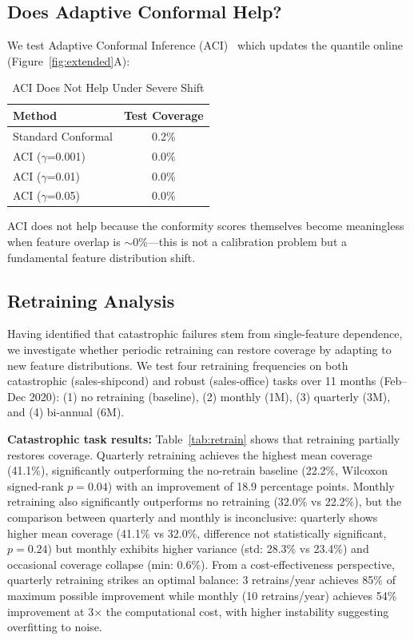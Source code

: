 \documentclass[sigconf]{acmart}
\begin{document}
\subsection{Does Adaptive Conformal Help?}

We test Adaptive Conformal Inference (ACI)~\cite{gibbs2021adaptive} which updates the quantile online (Figure~\ref{fig:extended}A):

\begin{table}[h]
\centering
\caption{ACI Does Not Help Under Severe Shift}
\label{tab:aci}
\begin{tabular}{lc}
\toprule
Method & Test Coverage \\
\midrule
Standard Conformal & 0.2\% \\
ACI ($\gamma$=0.001) & 0.0\% \\
ACI ($\gamma$=0.01) & 0.0\% \\
ACI ($\gamma$=0.05) & 0.0\% \\
\bottomrule
\end{tabular}
\end{table}

ACI does not help because the conformity scores themselves become meaningless when feature overlap is $\sim$0\%---this is not a calibration problem but a fundamental feature distribution shift.

\subsection{Retraining Analysis}

Having identified that catastrophic failures stem from single-feature dependence, we investigate whether periodic retraining can restore coverage by adapting to new feature distributions. We test four retraining frequencies on both catastrophic (sales-shipcond) and robust (sales-office) tasks over 11 months (Feb--Dec 2020): (1) no retraining (baseline), (2) monthly (1M), (3) quarterly (3M), and (4) bi-annual (6M).

\textbf{Catastrophic task results:} Table~\ref{tab:retrain} shows that retraining partially restores coverage. Quarterly retraining achieves the highest mean coverage (41.1\%), significantly outperforming the no-retrain baseline (22.2\%, Wilcoxon signed-rank $p=0.04$) with an improvement of 18.9 percentage points. Monthly retraining also significantly outperforms no retraining (32.0\% vs 22.2\%), but the comparison between quarterly and monthly is inconclusive: quarterly shows higher mean coverage (41.1\% vs 32.0\%, difference not statistically significant, $p=0.24$) but monthly exhibits higher variance (std: 28.3\% vs 23.4\%) and occasional coverage collapse (min: 0.6\%). From a cost-effectiveness perspective, quarterly retraining strikes an optimal balance: 3 retrains/year achieves 85\% of maximum possible improvement while monthly (10 retrains/year) achieves 54\% improvement at 3× the computational cost, with higher instability suggesting overfitting to noise.
\end{document}
